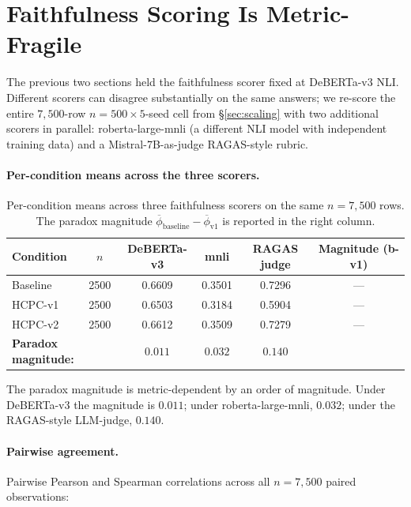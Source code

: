\section{Faithfulness Scoring Is Metric-Fragile}
\label{sec:multimetric}

The previous two sections held the faithfulness scorer fixed at
DeBERTa-v3 NLI. Different scorers can disagree substantially on
the same answers; we re-score the entire $7{,}500$-row
$n{=}500{\times}5$-seed cell from \S\ref{sec:scaling} with two
additional scorers in parallel: roberta-large-mnli (a different
NLI model with independent training data) and a Mistral-7B-as-judge
RAGAS-style rubric.

\paragraph{Per-condition means across the three scorers.}

\begin{table}[H]
\centering
\small
\caption{Per-condition means across three faithfulness scorers on
the same $n{=}7{,}500$ rows. The paradox magnitude
$\overline{\phi}_{\text{baseline}} - \overline{\phi}_{\text{v1}}$
is reported in the right column.}
\label{tab:multimetric-means}
\begin{tabular}{lccccc}
\toprule
Condition & $n$ & DeBERTa-v3 & mnli & RAGAS judge & Magnitude (b-v1) \\
\midrule
Baseline   & 2500 & 0.6609 & 0.3501 & 0.7296 & --- \\
HCPC-v1    & 2500 & 0.6503 & 0.3184 & 0.5904 & --- \\
HCPC-v2    & 2500 & 0.6612 & 0.3509 & 0.7279 & --- \\
\midrule
\multicolumn{2}{l}{\textbf{Paradox magnitude:}} & $0.011$ & $0.032$ & $\mathbf{0.140}$ & \\
\bottomrule
\end{tabular}
\end{table}

The paradox magnitude is metric-dependent by an order of magnitude.
Under DeBERTa-v3 the magnitude is $0.011$; under
roberta-large-mnli, $0.032$; under the RAGAS-style LLM-judge,
$0.140$.

\paragraph{Pairwise agreement.}
Pairwise Pearson and Spearman correlations across all $n{=}7{,}500$
paired observations:


